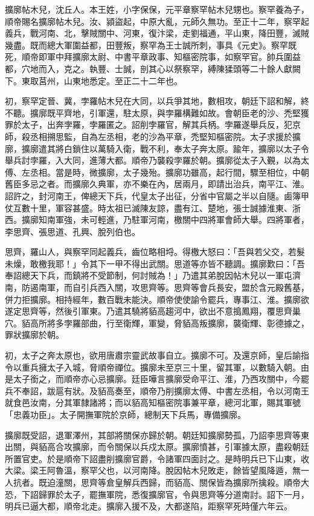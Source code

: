 



擴廓帖木兒，沈丘人。本王姓，小字保保，元平章察罕帖木兒甥也。察罕養為子，順帝賜名擴廓帖木兒。汝、潁盜起，中原大亂，元師久無功。至正十二年，察罕起義兵，戰河南、北，擊賊關中、河東，復汴梁，走劉福通，平山東，降田豐，滅賊幾盡。既而總大軍圍益都，田豐叛，察罕為王士誠所刺，事具《元史》。察罕既死，順帝即軍中拜擴廓太尉、中書平章政事、知樞密院事，如察罕官。帥兵圍益都，穴地而入，克之。執豐、士誠，剖其心以祭察罕，縛陳猱頭等二十餘人獻闕下。東取莒州，山東地悉定。至正二十二年也。

初，察罕定晉、冀，孛羅帖木兒在大同，以兵爭其地，數相攻，朝廷下詔和解，終不聽。擴廓既平齊地，引軍還，駐太原，與孛羅構難如故。會朝臣老的沙、禿堅獲罪於太子，出奔孛羅，孛羅匿之。詔削孛羅官，解其兵柄。孛羅遂舉兵反，犯京師，殺丞相搠思監，自為左丞相，老的沙為平章，禿堅知樞密院。太子求援於擴廓，擴廓遣其將白鎖住以萬騎入衛，戰不利，奉太子奔太原。踰年，擴廓以太子令舉兵討孛羅，入大同，進薄大都。順帝乃襲殺孛羅於朝。擴廓從太子入覲，以為太傅、左丞相。當是時，微擴廓，太子幾殆。擴廓功雖高，起行間，驟至相位，中朝舊臣多忌之者。而擴廓久典軍，亦不樂在內，居兩月，即請出治兵，南平江、淮。詔許之，封河南王，俾總天下兵，代皇太子出征，分省中官屬之半以自隨。鹵簿甲仗互數十里，軍容甚盛。時太祖已滅陳友諒，盡有江、楚地，張士誠據淮東、浙西。擴廓知南軍強，未可輕進，乃駐軍河南，檄關中四將軍會師大舉。四將軍者，李思齊、張思道、孔興、脫列伯也。

思齊，羅山人，與察罕同起義兵，齒位略相埒。得檄大怒曰：「吾與若父交，若髮未燥，敢檄我耶！」令其下一甲不得出武關。思道等亦皆不聽調。擴廓歎曰：「吾奉詔總天下兵，而鎮將不受節制，何討賊為！」乃遣其弟脫因帖木兒以一軍屯濟南，防遏南軍，而自引兵西入關，攻思齊等。思齊等會兵長安，盟於含元殿舊基，併力拒擴廓。相持經年，數百戰未能決。順帝使使諭令罷兵，專事江、淮。擴廓欲遂定思齊等，然後引軍東。乃遣其驍將貊高趨河中，欲出不意搗鳳翔，覆思齊巢穴。貊高所將多孛羅部曲，行至衛輝，軍變，脅貊高叛擴廓，襲衛輝、彰德據之，罪狀擴廓於朝。

初，太子之奔太原也，欲用唐肅宗靈武故事自立。擴廓不可。及還京師，皇后諭指令以重兵擁太子入城，脅順帝禪位。擴廓未至京三十里，留其軍，以數騎入朝。由是太子銜之，而順帝亦心忌擴廓。廷臣嘩言擴廓受命平江、淮，乃西攻關中，今罷兵不奉詔，跋扈有狀。及貊高奏至，順帝乃削擴廓太傅、中書左丞相，令以河南王就食邑汝南，分其軍隸諸將；而以貊高知樞密院事兼平章，總河北軍，賜其軍號「忠義功臣」。太子開撫軍院於京師，總制天下兵馬，專備擴廓。

擴廓既受詔，退軍澤州，其部將關保亦歸於朝。朝廷知擴廓勢孤，乃詔李思齊等東出關，與貊高合攻擴廓，而令關保以兵戍太原。擴廓憤甚，引軍據太原，盡殺朝廷所置官吏。於是順帝下詔盡削擴廓官爵，令諸軍四面討之。是時明兵已下山東，收大梁。梁王阿魯溫，察罕父也，以河南降。脫因帖木兒敗走，餘皆望風降遁，無一人抗者。既迫潼關，思齊等倉皇解兵西歸，而貊高、關保皆為擴廓所擒殺。順帝大恐，下詔歸罪於太子，罷撫軍院，悉復擴廓官，令與思齊等分道南討。詔下一月，明兵已逼大都，順帝北走。擴廓入援不及，大都遂陷，距察罕死時僅六年云。

